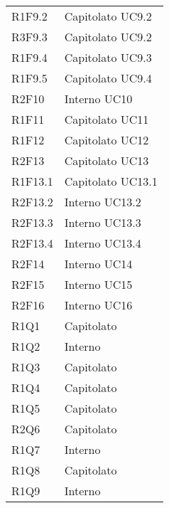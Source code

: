 \begin{longtable} {
			>{\centering}p{28mm}  
			>{}p{20mm}
		}
		R1F9.2 & Capitolato UC9.2 \TBstrut \\ [2mm]
		R3F9.3 & Capitolato UC9.2 \TBstrut \\ [2mm]
		R1F9.4 & Capitolato UC9.3 \TBstrut \\ [2mm]
		R1F9.5 & Capitolato UC9.4 \TBstrut \\ [2mm]
		R2F10 & Interno UC10 \TBstrut \\ [2mm]
		R1F11 & Capitolato UC11 \TBstrut \\ [2mm]		
		R1F12 & Capitolato UC12 \TBstrut \\ [2mm]	
		R2F13 & Capitolato UC13 \TBstrut \\ [2mm]		
		R1F13.1 & Capitolato UC13.1 \TBstrut \\ [2mm]		
		R2F13.2 & Interno UC13.2 \TBstrut \\ [2mm]		
		R2F13.3 & Interno UC13.3 \TBstrut \\ [2mm]	
		R2F13.4 & Interno UC13.4 \TBstrut \\ [2mm]	
		R2F14 & Interno UC14 \TBstrut \\ [2mm]		
		R2F15 & Interno UC15 \TBstrut \\ [2mm]		
		R2F16 & Interno UC16 \TBstrut \\ [2mm]	
		
		R1Q1 & Capitolato \TBstrut \\ [2mm]
		R1Q2 & Interno \TBstrut \\ [2mm]
		R1Q3 & Capitolato \TBstrut \\ [2mm]
		R1Q4 & Capitolato \TBstrut \\ [2mm]
		R1Q5 & Capitolato \TBstrut \\ [2mm]
		R2Q6 & Capitolato \TBstrut \\ [2mm]
		R1Q7 & Interno \TBstrut \\ [2mm]
		R1Q8 & Capitolato \TBstrut \\ [2mm]
		R1Q9 & Interno \TBstrut \\ [2mm]
		

\end{longtable}
